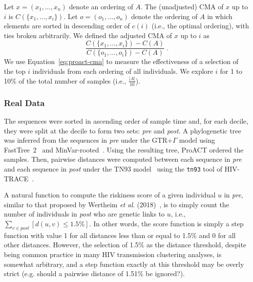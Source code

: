 Let $x=(x_1,\ldots,x_n)$ denote an ordering of $A$. The (unadjusted) \gls{CMA} of $x$ up to $i$ is $C\left(\{x_1,\ldots,x_i\}\right)$. Let $o=(o_1,\ldots,o_n)$ denote the ordering of $A$ in which elements are sorted in descending order of $c(i)$ (i.e., the optimal ordering), with ties broken arbitrarily. We defined the adjusted \gls{CMA} of $x$ up to $i$ as
\begin{equation}\label{eq:proact-cma}
    \frac{C\left(\{x_1,\ldots,x_i\}\right)-C(A)}{C\left(\{o_1,\ldots,o_i\}\right)-C(A)}\; .
\end{equation}
We use Equation~\ref{eq:proact-cma} to measure the effectiveness of a selection of the top $i$ individuals from each ordering of all individuals. We explore $i$ for 1 to 10\% of the total number of samples (i.e., $\frac{|A|}{10}$).

\subsubsection{Real Data}
The sequences were sorted in ascending order of sample time and, for each decile, they were split at the decile to form two sets: \textit{pre} and \textit{post}. A phylogenetic tree was inferred from the sequences in \textit{pre} under the \gls{GTR}+$\Gamma$ model using FastTree~2~\cite{Price2010} and MinVar-rooted~\cite{Mai2017}. Using the resulting tree, ProACT ordered the samples. Then, pairwise distances were computed between each sequence in \textit{pre} and each sequence in \textit{post} under the \gls{TN93} model~\cite{Tamura1993} using the \texttt{tn93} tool of HIV-TRACE~\cite{Pond2018}.

A natural function to compute the riskiness score of a given individual $u$ in \textit{pre}, similar to that proposed by Wertheim \textit{et al}. (2018)~\cite{Wertheim2018}, is to simply count the number of individuals in \textit{post} who are genetic links to $u$, i.e., $\sum_{v\in post}{\left[d(u,v)\le1.5\%\right]}$. In other words, the score function is simply a step function with value 1 for all distances less than or equal to 1.5\% and 0 for all other distances. However, the selection of 1.5\% as the distance threshold, despite being common practice in many \gls{HIV} transmission clustering analyses, is somewhat arbitrary, and a step function exactly at this threshold may be overly strict (e.g. should a pairwise distance of 1.51\% be ignored?).

